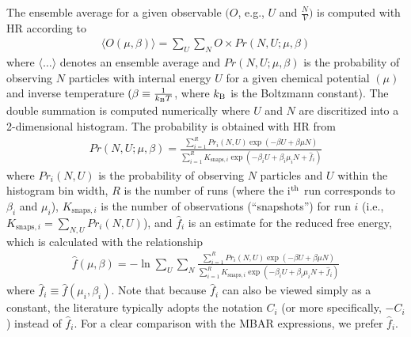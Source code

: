 \documentclass[journal=jced,manuscript=article]{achemso}
\begin{document}
The ensemble average for a given observable $(O$, e.g., $U$ and $\frac{N}{V})$ is computed with HR according to
\begin{eqnarray} \label{eq: HR ave}
\langle O(\mu,\beta) \rangle = \sum_{U} \sum_{N} O \times Pr(N,U;\mu,\beta)
\end{eqnarray}
where $\langle \dots \rangle$ denotes an ensemble average and $Pr(N,U;\mu,\beta)$ is the probability of observing $N$ particles with internal energy $U$ for a given chemical potential $(\mu)$ and inverse temperature $(\beta \equiv \frac{1}{k_{\rm B}T}$, where $k_{\rm B}$ is the Boltzmann constant). The double summation is computed numerically where $U$ and $N$ are discritized into a 2-dimensional histogram. The probability is obtained with HR from
\begin{eqnarray} \label{eq: HR prob}
Pr(N,U;\mu,\beta) = \frac{\sum_{i=1}^{R} Pr_i(N,U)  \exp(-\beta U + \beta \mu N)}{\sum_{i=1}^{R} K_{\mathrm{snaps}, i} \exp(-\beta_i U + \beta_i \mu_i N + \hat f_i)}
\end{eqnarray}
where $Pr_i(N,U)$ is the probability of observing $N$ particles and $U$ within the histogram bin width, $R$ is the number of runs (where the i$^{\rm th}$ run corresponds to $\beta_i$ and $\mu_i$), $K_{\mathrm{snaps}, i}$ is the number of observations (``snapshots'') for run $i$ (i.e., $K_{\mathrm{snaps}, i} = \sum_{N,U} Pr_i(N,U)$), and $\hat f_i$ is an estimate for the reduced free energy, which is calculated with the relationship
\begin{eqnarray} \label{eq: Weights}
\hat f(\mu,\beta) = - \ln \sum_{U} \sum_{N} \frac{\sum_{i=1}^{R} Pr_i(N,U) \exp(-\beta U + \beta \mu N)}{\sum_{i=1}^{R} K_{\mathrm{snaps}, i} \exp(-\beta_i U + \beta_i \mu_i N + \hat f_i)}
\end{eqnarray}
where $\hat f_i \equiv \hat f(\mu_i,\beta_i)$. Note that because $\hat f_i$ can also be viewed simply as a constant, the literature typically adopts the notation $C_i$ (or more specifically, $-C_i$) instead of $\hat f_i$. For a clear comparison with the MBAR expressions, we prefer $\hat f_i$.
\end{document}
